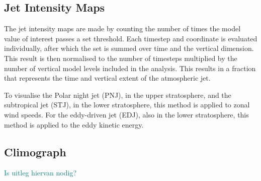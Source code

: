 \subsection{Jet Intensity Maps}
The jet intensity maps are made by counting the number of times the model value of interest passes a set threshold. Each timestep and coordinate is evaluated individually, after which the set is summed over time and the vertical dimension. This result is then normalised to the number of timesteps multiplied by the number of vertical model levels included in the analysis. This results in a fraction that represents the time and vertical extent of the atmospheric jet. 

To visualise the Polar night jet (PNJ), in the upper stratosphere, and the subtropical jet (STJ), in the lower stratosphere, this method is applied to zonal wind speeds. For the eddy-driven jet (EDJ), also in the lower stratosphere, this method is applied to the eddy kinetic energy. 

\subsection{Climograph}
\textcolor{teal}{Is uitleg hiervan nodig?}
